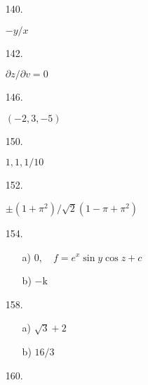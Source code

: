 \documentclass[11pt]{amsbook}
\begin{document}
\begin{enumerate}
\begin{multicols}{2}
\begin{enumerate}
	    \end{enumerate}
	\end{multicols}
	

    \item[140.]
        
        $ -y / x $

      
    \item[142.]
        
        $ \partial z / \partial v = 0 $
        
    
    \item[146.]
        
        $ ( -2 , 3 , -5 ) $
        

    \item[150.]
        
        $ 1 , 1 , 1/10 $
        
        
    \item[152.]
        
        $ \pm ( 1 + \pi ^{2} ) / \sqrt{2} ( 1 - \pi + \pi ^{2} ) $
        
        
    \item[154.]
	
	\begin{multicols}{2}
	    \begin{enumerate}
            
		\item[a)]
		  $ 0 , \quad f = e^{x} \sin y \cos z + c $

		\item[b)]
		  $ - \mathrm{k} $

	    \end{enumerate}
	\end{multicols}
	
	
    \item[158.]
	
	\begin{multicols}{2}
	    \begin{enumerate}
            
		\item[a)]
		  $ \sqrt{3} + 2 $

		\item[b)]
		  $ 16 / 3 $

	    \end{enumerate}
	\end{multicols}
        
        
    \item[160.]
	
	\begin{multicols}{2}
	    \begin{enumerate}
            

\end{enumerate}
\end{multicols}
\end{enumerate}
\end{document}
